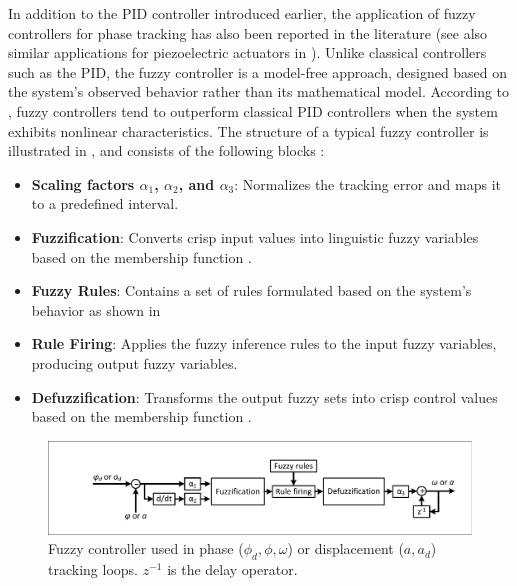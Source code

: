 \documentclass[preprint,12pt]{elsarticle}
\begin{document}
In addition to the PID controller introduced earlier, the application of fuzzy controllers for phase tracking has also been reported in the literature \cite{Ji_2010} (see also similar applications for piezoelectric actuators in \cite{MA2024107318,ZHANG2015140}). Unlike classical controllers such as the PID, the fuzzy controller is a model-free approach, designed based on the system's observed behavior rather than its mathematical model. According to \cite{Ross2010}, fuzzy controllers tend to outperform classical PID controllers when the system exhibits nonlinear characteristics. The structure of a typical fuzzy controller is illustrated in , and consists of the following blocks \cite{Ross2010}:
\begin{itemize}
    \item \textbf{Scaling factors $\alpha_1$, $\alpha_2$, and $\alpha_3$}: Normalizes the tracking error and maps it to a predefined interval.
    \item \textbf{Fuzzification}: Converts crisp input values into linguistic fuzzy variables based on the membership function .
    \item \textbf{Fuzzy Rules}: Contains a set of rules formulated based on the system's behavior as shown in 
    \item \textbf{Rule Firing}: Applies the fuzzy inference rules to the input fuzzy variables, producing output fuzzy variables.
    \item \textbf{Defuzzification}: Transforms the output fuzzy sets into crisp control values based on the membership function .
\end{itemize}
\begin{figure}
    \centering    \includegraphics[width=0.9\linewidth]{Fuzzy_controller.pdf}
    \caption{Fuzzy controller used in phase ($\phi_d, \phi, \omega$) or displacement ($a, a_d$) tracking loops. $z^{-1}$ is the delay operator.}
    \label{F_fuzzy_diagram}
\end{figure}
\end{document}
